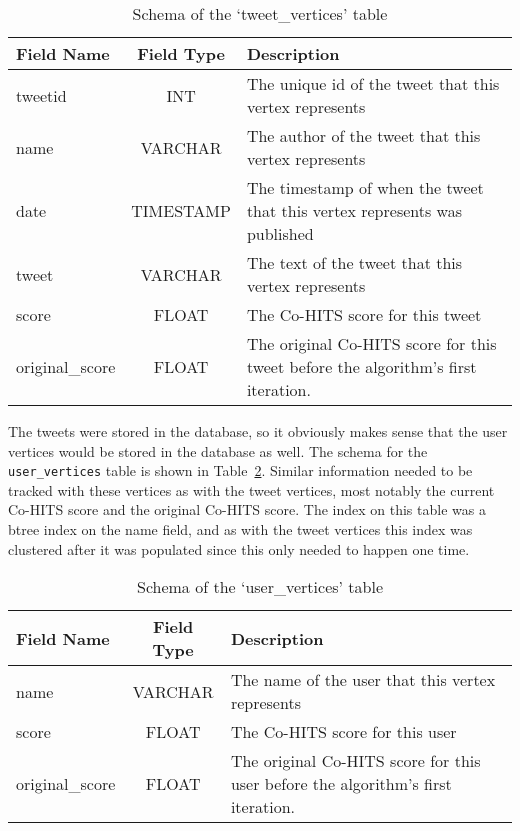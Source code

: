 \begin{table}
\centering
\begin{tabular}{l|c|p{8cm}}
{\bf Field Name} & {\bf Field Type} & {\bf Description} \\ \hline
tweetid & INT & The unique id of the tweet that this vertex represents \\ \hline
name & VARCHAR & The author of the tweet that this vertex represents \\ \hline
date & TIMESTAMP  & The timestamp of when the tweet that this vertex represents was published \\ \hline
tweet & VARCHAR & The text of the tweet that this vertex represents \\ \hline
score & FLOAT & The Co-HITS score for this tweet \\ \hline
original\_score & FLOAT & The original Co-HITS score for this tweet before the algorithm's first iteration. \\
\end{tabular}
\caption{Schema of the `tweet\_vertices' table}
\label{tab:tweetverticesSchema}
\end{table}

The tweets were stored in the database, so it obviously makes sense that the user vertices would be stored in the database as well. The schema for the \texttt{user\_vertices} table is shown in Table~\ref{tab:userverticesSchema}. Similar information needed to be tracked with these vertices as with the tweet vertices, most notably the current Co-HITS score and the original Co-HITS score. The index on this table was a btree index on the name field, and as with the tweet vertices this index was clustered after it was populated since this only needed to happen one time.

\begin{table}
\centering
\begin{tabular}{l|c|p{8cm}}
{\bf Field Name} & {\bf Field Type} & {\bf Description} \\ \hline
name & VARCHAR & The name of the user that this vertex represents \\ \hline
score & FLOAT & The Co-HITS score for this user \\ \hline
original\_score & FLOAT & The original Co-HITS score for this user before the algorithm's first iteration. \\
\end{tabular}
\caption{Schema of the `user\_vertices' table}
\label{tab:userverticesSchema}
\end{table}

